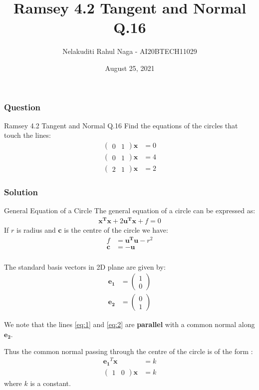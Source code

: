 \documentclass{beamer}
\title{Ramsey 4.2 Tangent and Normal Q.16}
\author{Nelakuditi Rahul Naga - AI20BTECH11029}
\date{August 25, 2021 }
\newcommand{\myvec}[1]{\ensuremath{\begin{pmatrix}#1\end{pmatrix}}}
\renewcommand{\vec}[1]{\mathbf{#1}}
\begin{document}
\begin{frame}
\titlepage
\end{frame}

\begin{frame}
\frametitle{Question}
\begin{block}{Ramsey 4.2 Tangent and Normal Q.16}
Find the equations of the circles that touch the lines:
\begin{align}
\myvec{0 & 1}\vec{x} &= 0 \label{eq:1}
\\\myvec{0 & 1}\vec{x} &= 4 \label{eq:2}
\\\myvec{2 & 1}\vec{x} &= 2 \label{eq:3}
\end{align}
\end{block}
\end{frame}

\begin{frame}
\frametitle{Solution}
\begin{block}{General Equation of a Circle}
The general equation of a circle can be expressed as:
\begin{align}
\vec{x^T}\vec{x} + 2\vec{u^T}\vec{x} + f = 0 \label{eq:4}
\end{align}
If $r$ is radius and $\vec{c}$ is the centre of the circle we have:
\begin{align}
f &=\vec{u^T}\vec{u}-r^2  \label{eq:5} \\  
\vec{c} &=-\vec{u}
\end{align}
\end{block}
\end{frame}

\begin{frame}
\frametitle{}
The standard basis vectors in 2D plane are given by:
\begin{align}
\vec{e_{1}} &= \myvec{1 \\ 0}
\\\vec{e_{2}} &= \myvec{0 \\ 1}
\end{align}

We note that the lines \eqref{eq:1} and \eqref{eq:2} are \textbf{parallel} with a common normal along $\vec{e_{2}}$. 

Thus the common normal passing through the centre of the circle is of the form :
\begin{align}
\vec{e_{1}}^T\vec{x} &= k\\
\myvec{1 & 0}\vec{x}&=k 
\end{align}
where $k$ is a constant.
\end{frame}
\end{document}
